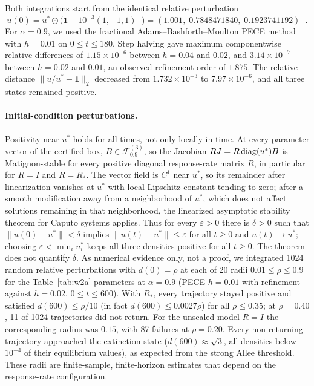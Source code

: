 Both integrations start from the identical relative perturbation
\[
 u(0)=u^*\odot\bigl(\mathbf 1+10^{-3}(1,-1,1)^\top\bigr)
      =(1.001,\;0.7848471840,\;0.1923741192)^\top.
\]
For \(\alpha=0.9\), we used the fractional Adams--Bashforth--Moulton PECE method \cite{Garrappa2010,Garrappa2018,Diethelm2010} with \(h=0.01\) on \(0\le t\le180\). Step halving gave maximum componentwise relative differences of \(1.15\times10^{-6}\) between \(h=0.04\) and \(0.02\), and \(3.14\times10^{-7}\) between \(h=0.02\) and \(0.01\), an observed refinement order of \(1.875\). The relative distance \(\|u/u^*-\mathbf 1\|_2\) decreased from \(1.732\times10^{-3}\) to \(7.97\times10^{-6}\), and all three states remained positive.

\paragraph{Initial-condition perturbations.}
Positivity near \(u^*\) holds for all times, not only locally in time. At every parameter vector of the certified box, \(B\in\mathcal F_{0.9}^{(3)}\), so the Jacobian \(RJ=R\operatorname{diag}(u^*)B\) is Matignon-stable for every positive diagonal response-rate matrix \(R\), in particular for \(R=I\) and \(R=R_*\). The vector field is \(C^1\) near \(u^*\), so its remainder after linearization vanishes at \(u^*\) with local Lipschitz constant tending to zero; after a smooth modification away from a neighborhood of \(u^*\), which does not affect solutions remaining in that neighborhood, the linearized asymptotic stability theorem for Caputo systems \cite[Theorem~3.1]{CongDoanSiegmundTuan2016} applies. Thus for every \(\varepsilon>0\) there is \(\delta>0\) such that \(\|u(0)-u^*\|<\delta\) implies \(\|u(t)-u^*\|\le\varepsilon\) for all \(t\ge0\) and \(u(t)\to u^*\); choosing \(\varepsilon<\min_iu_i^*\) keeps all three densities positive for all \(t\ge0\). The theorem does not quantify \(\delta\). As numerical evidence only, not a proof, we integrated 1024 random relative perturbations with \(d(0)=\rho\) at each of 20 radii \(0.01\le\rho\le0.9\) for the Table~\ref{tab:w2a} parameters at \(\alpha=0.9\) (PECE \(h=0.01\) with refinement against \(h=0.02\), \(0\le t\le600\)). With \(R_*\), every trajectory stayed positive and satisfied \(d(600)\le\rho/10\) (in fact \(d(600)\le0.0027\rho\)) for all \(\rho\le0.35\); at \(\rho=0.40\), 11 of 1024 trajectories did not return. For the unscaled model \(R=I\) the corresponding radius was \(0.15\), with 87 failures at \(\rho=0.20\). Every non-returning trajectory approached the extinction state (\(d(600)\approx\sqrt3\), all densities below \(10^{-4}\) of their equilibrium values), as expected from the strong Allee threshold. These radii are finite-sample, finite-horizon estimates that depend on the response-rate configuration.

